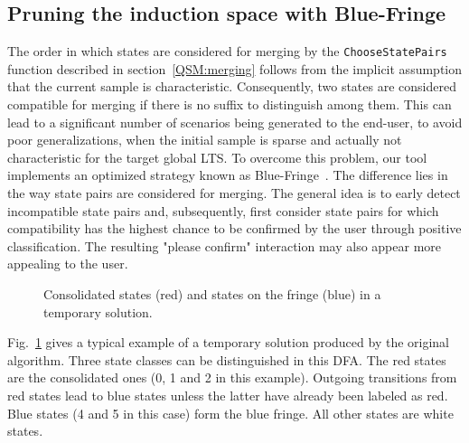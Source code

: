 \subsection{Pruning the induction space with Blue-Fringe\label{BlueFringe}}

The order in which states are considered for merging by the \texttt{ChooseStatePairs} function described in section~\ref{QSM:merging} follows from the implicit assumption that the current sample is characteristic. Consequently, two states are considered compatible for merging if there is no suffix to distinguish among them. This can lead to a significant number of scenarios being generated to the end-user, to avoid poor generalizations, when the initial sample is sparse and actually not characteristic for the target global LTS. To overcome this problem, our tool implements an optimized strategy known as Blue-Fringe~\cite{Lang98}. The difference lies in the way state pairs are considered for merging. The general idea is to early detect incompatible state pairs and, subsequently, first consider state pairs for which compatibility has the highest chance to be confirmed by the user through positive classification. The resulting "please confirm" interaction may also appear more appealing to the user.

\begin{figure}[H]
\hspace*{-1cm}
\vspace*{-.5cm}
\caption{Consolidated states (red) and states on the fringe (blue) in a temporary solution\label{Fig:BlueFringe}.}
\end{figure}

\noindent
 Fig.~\ref{Fig:BlueFringe} gives a typical example of a temporary solution produced by the original algorithm. Three state classes can be distinguished in this DFA. The red states are the consolidated ones (0, 1 and 2 in this example). Outgoing transitions from red states lead to blue states unless the latter have already been labeled as red. Blue states (4 and 5 in this case) form the blue fringe. All other states are white states. 


